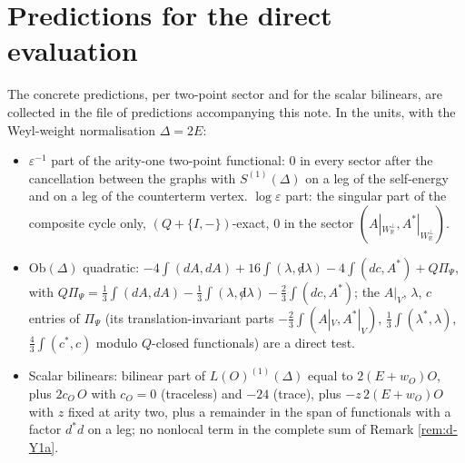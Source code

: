 \section{Predictions for the direct evaluation}

The concrete predictions, per two-point sector and for the scalar bilinears, are collected in the file of predictions accompanying this note. In the units, with the Weyl-weight normalisation $\Delta=2E$:
\begin{itemize}
\item $\varepsilon^{-1}$ part of the arity-one two-point functional: $0$ in every sector after the cancellation between the graphs with $S^{(1)}(\Delta)$ on a leg of the self-energy and on a leg of the counterterm vertex. $\log\varepsilon$ part: the singular part of the composite cycle only, $(Q+\{I,-\})$-exact, $0$ in the sector $(A|_{W_{\mathbb R}^\perp},A^*|_{W_{\mathbb R}^\perp})$.
\item $\mathrm{Ob}(\Delta)$ quadratic: $-4\int(dA,dA)+16\int(\lambda,{\not d}\lambda)-4\int(dc,A^*)+Q\Pi_\Psi$, with $Q\Pi_\Psi=\tfrac13\int(dA,dA)-\tfrac13\int(\lambda,{\not d}\lambda)-\tfrac23\int(dc,A^*)$; the $A|_V$, $\lambda$, $c$ entries of $\Pi_\Psi$ (its translation-invariant parts $-\tfrac23\int(A|_V,A^*|_V)$, $\tfrac13\int(\lambda^*,\lambda)$, $\tfrac43\int(c^*,c)$ modulo $Q$-closed functionals) are a direct test.
\item Scalar bilinears: bilinear part of $L(O)^{(1)}(\Delta)$ equal to $2(E+w_O)O$, plus $2c_O\,O$ with $c_O=0$ (traceless) and $-24$ (trace), plus $-z\,2(E+w_O)O$ with $z$ fixed at arity two, plus a remainder in the span of functionals with a factor $d^*d$ on a leg; no nonlocal term in the complete sum of Remark \ref{rem:d-Y1a}.
\end{itemize}
